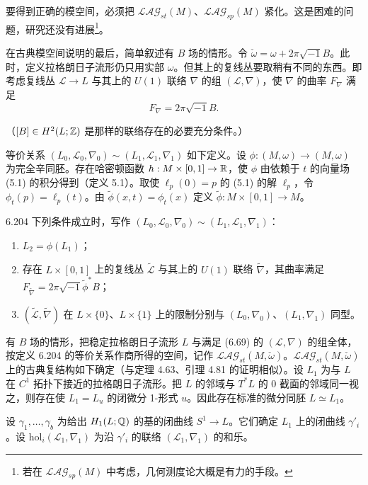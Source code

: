 要得到正确的模空间，必须把 $\mathcal{LAG}_{st}(M)$、$\mathcal{LAG}_{sp}(M)$ 紧化。这是困难的问题，研究还没有进展\footnote{若在 $\mathcal{LAG}_{sp}(M)$ 中考虑，几何测度论大概是有力的手段。}。

在古典模空间说明的最后，简单叙述有 $B$ 场的情形。令 $\check\omega=\omega+2\pi\sqrt{-1}B$。此时，定义拉格朗日子流形仍只用实部 $\omega$。但其上的复线丛要取稍有不同的东西。即考虑复线丛 $\mathcal L\to L$ 与其上的 $U(1)$ 联络 $\nabla$ 的组 $(\mathcal L,\nabla)$，使 $\nabla$ 的曲率 $F_\nabla$ 满足
\begin{equation}
  F_\nabla=2\pi\sqrt{-1}B. \tag{6.69}
\end{equation}

（$[B]\in H^2(L;\mathbb{Z})$ 是那样的联络存在的必要充分条件。）

等价关系 $(L_0,\mathcal L_0,\nabla_0)\sim(L_1,\mathcal L_1,\nabla_1)$ 如下定义。设 $\phi:(M,\omega)\to(M,\omega)$ 为完全辛同胚。存在哈密顿函数 $h:M\times[0,1]\to\mathbb{R}$，使 $\phi$ 由依赖于 $t$ 的向量场 (5.1) 的积分得到（定义 5.1）。取使 $\ell_p(0)=p$ 的 (5.1) 的解 $\ell_p$，令 $\phi_t(p)=\ell_p(t)$。由 $\tilde\phi(x,t)=\phi_t(x)$ 定义 $\tilde\phi:M\times[0,1]\to M$。

\begin{definition}{6.204}
  下列条件成立时，写作 $(L_0,\mathcal L_0,\nabla_0)\sim(L_1,\mathcal L_1,\nabla_1)$：
  \begin{enumerate}[label=（\arabic*）]
    \item $L_2=\phi(L_1)$；
    \item 存在 $L\times[0,1]$ 上的复线丛 $\tilde{\mathcal L}$ 与其上的 $U(1)$ 联络 $\tilde\nabla$，其曲率满足 $F_{\tilde\nabla}=2\pi\sqrt{-1}\tilde\phi^*B$；
    \item $(\tilde{\mathcal L},\tilde\nabla)$ 在 $L\times\{0\}$、$L\times\{1\}$ 上的限制分别与 $(L_0,\nabla_0)$、$(L_1,\nabla_1)$ 同型。
  \end{enumerate}
\end{definition}

有 $B$ 场的情形，把稳定拉格朗日子流形 $L$ 与满足 (6.69) 的 $(\mathcal L,\nabla)$ 的组全体，按定义 6.204 的等价关系作商所得的空间，记作 $\mathcal{LAG}_{st}(M,\check\omega)$。$\mathcal{LAG}_{st}(M,\check\omega)$ 上的古典复结构如下确定（与定理 4.63、引理 4.81 的证明相似）。设 $L_1$ 为与 $L$ 在 $C^1$ 拓扑下接近的拉格朗日子流形。把 $L$ 的邻域与 $T^*L$ 的 $0$ 截面的邻域同一视之，则存在使 $L_1=L_u$ 的闭微分 1-形式 $u$。因此存在标准的微分同胚 $L\simeq L_1$。

设 $\gamma_1,\dots,\gamma_b$ 为给出 $H_1(L;\mathbb{Q})$ 的基的闭曲线 $S^1\to L$。它们确定 $L_1$ 上的闭曲线 $\gamma'_i$。设 $\mathrm{hol}_i(\mathcal L_1,\nabla_1)$ 为沿 $\gamma'_i$ 的联络 $(\mathcal L_1,\nabla_1)$ 的和乐。

